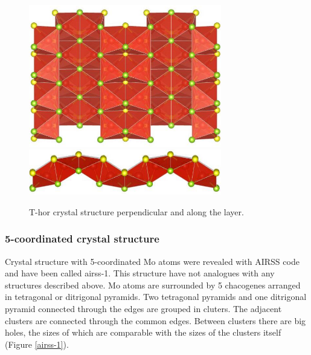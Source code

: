 \documentclass[a4paperm]{article}
\begin{document}
\begin{figure}[H]
        \includegraphics[width=0.75\textwidth]{T_hor_1.jpg} \\
        \includegraphics[width=0.75\textwidth]{T_hor_2.jpg}
        \caption{T-hor crystal structure perpendicular and along the layer.}
\label{T_hor}
\end{figure}


\subsubsection{5-coordinated crystal structure}

Crystal structure with 5-coordinated Mo atoms were revealed with AIRSS code and have been called airss-1.
This structure have not analogues with any structures described above.
Mo atoms are surrounded by 5 chacogenes arranged in tetragonal or ditrigonal pyramids.
Two tetragonal pyramids and one ditrigonal pyramid connected through the edges are grouped in cluters.
The adjacent clusters are connected through the common edges.
Between clusters there are big holes, the sizes of which are comparable with the sizes of the clusters itself (Figure \ref{airss-1}).
\end{document}
